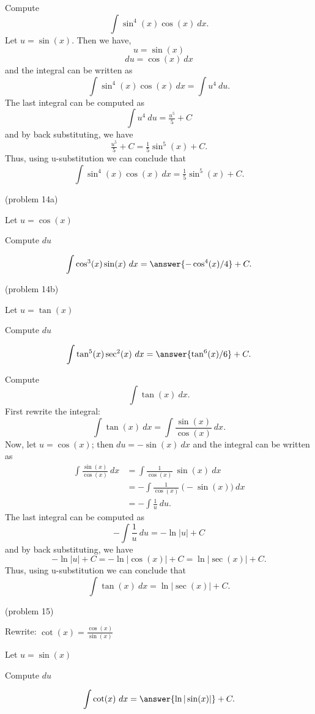 \documentclass{ximera}
\begin{document}
\begin{example}[example 14] Compute 
\[\int \sin^4(x)\cos(x) \ dx.\]
Let $u = \sin(x)$. Then we have,
\[u = \sin(x)\]
\[du = \cos(x) \ dx\]
and the integral can be written as 
\[\int \sin^4(x)\cos(x) \ dx  = \int u^4 \ du.\]
The last integral can be computed as 
\[\int u^4 \ du = \tfrac{u^5}{5} + C\]
and by back substituting, we have 
\[\tfrac{u^5}{5} + C = \tfrac15 \sin^5(x) + C.\]
Thus, using u-substitution we can conclude that
\[\int \sin^4(x)\cos(x) \ dx =  \tfrac15 \sin^5(x) + C.\]
\end{example}


\begin{problem}(problem 14a)
\begin{hint}
Let $u = \cos(x)$
\end{hint}
\begin{hint}
Compute $du$
\end{hint}
\[\int \cos^3(x)\sin(x) \ dx = \answer{-\cos^4(x)/4} +C.\]
\end{problem}


\begin{problem}(problem 14b)
\begin{hint}
Let $u = \tan(x)$
\end{hint}
\begin{hint}
Compute $du$
\end{hint}
\[\int \tan^5(x)\sec^2(x) \ dx = \answer{\tan^6(x)/6} +C.\]
\end{problem}

\begin{example}[example 15] Compute 
\[\int \tan(x) \ dx.\]
First rewrite the integral:
\[\int \tan(x) \ dx =\int \frac{\sin(x)}{\cos(x)} \ dx.\]
Now, let $u = \cos(x)$; then $du = -\sin(x) \ dx$
and the integral can be written as
\begin{align*}
\int \frac{\sin(x)}{\cos(x)} \ dx &= \int \frac{1}{\cos(x)}\ \sin(x) \  dx \\
 &=  - \int \frac{1}{\cos(x)}\ \big(-\sin(x)\big) \  dx\\
&=-\int \frac{1}{u} \ du.
\end{align*}
The last integral can be computed as 
\[-\int \frac{1}{u} \ du = -\ln|u| + C\]
and by back substituting, we have 
\[-\ln|u| + C = -\ln|\cos(x)| + C = \ln|\sec(x)| +C.\]
Thus, using u-substitution we can conclude that
\[\int \tan(x) \ dx =  \ln|\sec(x)| + C.\]
\end{example}

\begin{problem}(problem 15)
\begin{hint}
Rewrite: $\cot(x) = \frac{\cos(x)}{\sin(x)}$
\end{hint}
\begin{hint}
Let $u = \sin(x)$
\end{hint}
\begin{hint}
Compute $du$
\end{hint}
\[\int \cot(x) \ dx = \answer{\ln|\sin(x)|} +C.\]


\end{problem}
\end{document}
